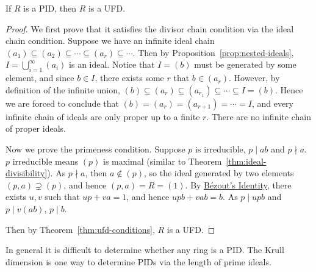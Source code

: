 \begin{theorem}\label{thm:pid-ufd}
    If \(R\) is a PID, then \(R\) is a UFD.\@
\end{theorem}
\begin{proof}
    We first prove that it satisfies the divisor chain condition
    via the ideal chain condition.
    Suppose we have an infinite ideal chain
    \((a_1) \subseteq (a_2) \subseteq \cdots \subseteq (a_r) \subseteq \cdots\).
    Then by Proposition~\ref{prop:nested-ideals},
    \(I = \bigcup_{i=1}^\infty (a_i)\) is an ideal.
    Notice that \(I = (b)\) must be generated by some element,
    and since \(b \in I\), there exists some \(r\) that \(b \in (a_r)\).
    However, by definition of the infinite union,
    \((b) \subseteq (a_r) \subseteq (a_{r_1}) \subseteq \cdots \subseteq I = (b)\).
    Hence we are forced to conclude that \((b) = (a_r) = (a_{r+1}) = \cdots = I\),
    and every infinite chain of ideals are only proper up to a finite \(r\).
    There are no infinite chain of proper ideals.

    Now we prove the primeness condition.
    Suppose \(p\) is irreducible, \(p \mid ab\) and \(p \nmid a\).
    \(p\) irreducible means \((p)\) is maximal
    (similar to Theorem~\ref{thm:ideal-divisibility}).
    As \(p \nmid a\), then \(a \notin (p)\),
    so the ideal generated by two elements \((p,a) \supsetneq (p)\),
    and hence \((p,a) = R = (1)\).
    By \hyperref[thm:bezout]{B\'{e}zout's Identity},
    there exists \(u,v\) such that \(up + va = 1\),
    and hence \(upb + vab = b\).
    As \(p \mid upb\) and \(p \mid v(ab)\), \(p \mid b\).

    Then by Theorem~\ref{thm:ufd-conditions}, \(R\) is a UFD.\@
\end{proof}
\begin{remark}
    In general it is difficult to determine whether any ring is a PID.\@
    The Krull dimension is one way to determine PIDs
    via the length of prime ideals.
\end{remark}

